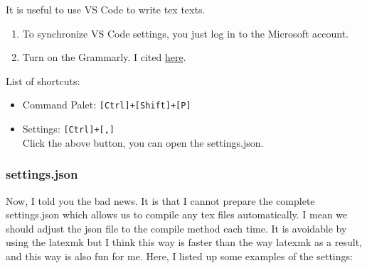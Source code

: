 \documentclass[a4paper,pdftex]{article}
\begin{document}
It is useful to use VS Code to write tex texts. 

\begin{enumerate}
  \item 
  To synchronize VS Code settings, you just log in to the Microsoft account.

  \item 
  Turn on the Grammarly. I cited \href{https://qiita.com/simonritchie/items/f49943f08cd09b92f3f9}{here}. 

\end{enumerate}

List of shortcuts:

\begin{itemize}
  \item 
  Command Palet: \texttt{[Ctrl]+[Shift]+[P]}

  \item 
  Settings: \texttt{[Ctrl]+[,]} \\
  Click the above button, you can open the settings.json.

\end{itemize}

\subsubsection{settings.json}

Now, I told you the bad news. It is that I cannot prepare the complete settings.json which allows us to compile any tex files automatically. I mean we should adjust the json file to the compile method each time. It is avoidable by using the latexmk but I think this way is faster than the way latexmk as a result, and this way is also fun for me. Here, I listed up some examples of the settings:
\end{document}
